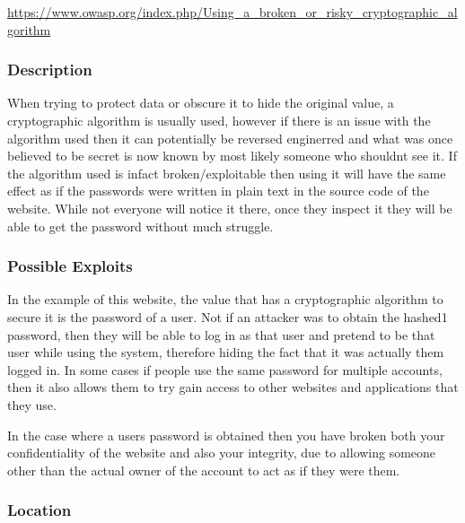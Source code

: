 \documentclass[titlepage]{article}
\begin{document}
      \url{https://www.owasp.org/index.php/Using_a_broken_or_risky_cryptographic_algorithm}

      \subsubsection{Description} %
      \label{ssub:description}
         
      When trying to protect data or obscure it to hide the original value, a cryptographic algorithm is usually used, however if there is an issue with the algorithm used then it can potentially be reversed enginerred and what was once believed to be secret is now known by most likely someone who shouldnt see it. If the algorithm used is infact broken/exploitable then using it will have the same effect as if the passwords were written in plain text in the source code of the website. While not everyone will notice it there, once they inspect it they will be able to get the password without much struggle.


      \subsubsection{Possible Exploits} %
      \label{ssub:possible_exploits}
      
      In the example of this website, the value that has a cryptographic algorithm to secure it is the password of a user. Not if an attacker was to obtain the hashed1 password, then they will be able to log in as that user and pretend to be that user while using the system, therefore hiding the fact that it was actually them logged in. In some cases if people use the same password for multiple accounts, then it also allows them to try gain access to other websites and applications that they use. 

      In the case where a users password is obtained then you have broken both your confidentiality of the website and also your integrity, due to allowing someone other than the actual owner of the account to act as if they were them. 


      \subsubsection{Location} %
      \label{ssub:location}
      
\end{document}
